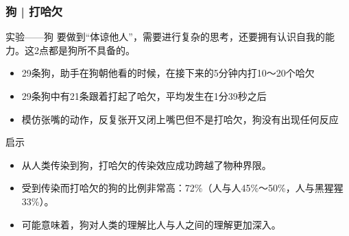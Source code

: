 \begin{frame}
  \frametitle{狗 | 打哈欠}
  \begin{block}{实验——狗}
    要做到“体谅他人”，需要进行复杂的思考，还要拥有认识自我的能力。这2点都是狗所不具备的。
    \begin{itemize}
      \item 29条狗，助手在狗朝他看的时候，在接下来的5分钟内打10～20个哈欠
      \item 29条狗中有21条跟着打起了哈欠，平均发生在1分39秒之后
      \item 模仿张嘴的动作，反复张开又闭上嘴巴但不是打哈欠，狗没有出现任何反应
    \end{itemize}
  \end{block}
  \pause
  \begin{block}{启示}
    \begin{itemize}
      \item 从人类传染到狗，打哈欠的传染效应成功跨越了物种界限。
      \item 受到传染而打哈欠的狗的比例非常高：72\%（人与人45\%～50\%，人与黑猩猩33\%）。
      \item 可能意味着，\alert{狗对人类的理解比人与人之间的理解更加深入}。
    \end{itemize}
  \end{block}
\end{frame}

